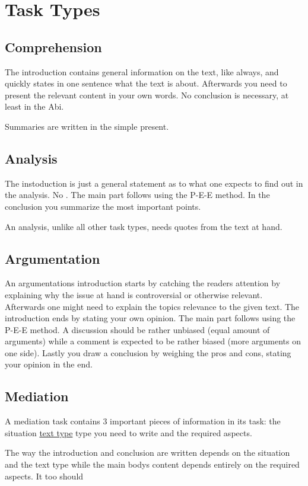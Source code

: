 \documentclass{article}
\begin{document}
\section{Task Types}
 
\subsection{Comprehension}
The introduction contains general information on the text, like always, and quickly states in one sentence what the text is about. \newline 
Afterwards you need to present the relevant content in your own words. \newline 
No conclusion is necessary, at least in the Abi. 
 
Summaries are written in the simple present. 
 
\subsection{Analysis} 
The instoduction is just a general statement as to what one expects to find out in the analysis. No . \newline 
The main part follows using the P-E-E method. \newline 
In the conclusion you summarize the most important points.
 
An analysis, unlike all other task types, needs quotes from the text at hand. 
 
\subsection{Argumentation}
An argumentations introduction starts by catching the readers attention by explaining why the issue at hand is controversial or otherwise relevant. Afterwards one might need to explain the topics relevance to the given text. The introduction ends by stating your own opinion. \newline 
The main part follows using the P-E-E method. A discussion should be rather unbiased (equal amount of arguments) while a comment is expected to be rather biased (more arguments on one side). \newline 
Lastly you draw a conclusion by weighing the pros and cons, stating your opinion in the end. 
 
\subsection{Mediation} 
A mediation task contains 3 important pieces of information in its task: the situation \hyperref[Text Type]{text type} type you need to write and the required aspects.
 
The way the introduction and conclusion are written depends on the situation and the text type while the main bodys content depends entirely on the required aspects. It too should 
\end{document}
